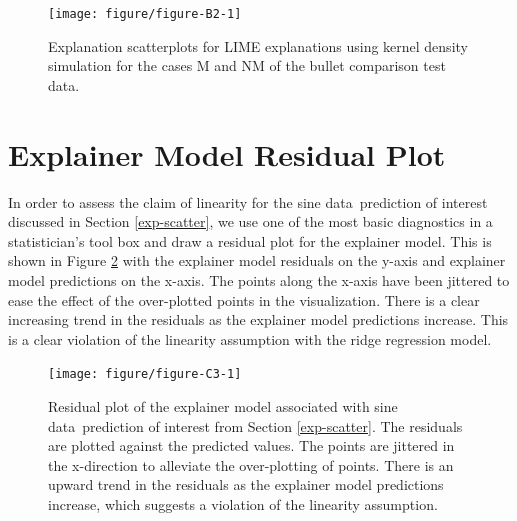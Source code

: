\documentclass[AMS,STIX2COL]{WileyNJD-v2}\usepackage[]{graphicx}\usepackage[]{color}
\newenvironment{knitrout}{}{} %
\newcommand{\data}{sine data}
\begin{document}
\begin{figure}[!thp]
\begin{knitrout}
\color{fgcolor}

{\centering \texttt{[image: figure/figure-B2-1]} 

}



\end{knitrout}
\caption{Explanation scatterplots for LIME explanations using kernel density simulation for the cases M and NM of the bullet comparison test data.}
\label{fig:figure-B2}
\end{figure}

\section{Explainer Model Residual Plot} \label{residual-plot}

In order to assess the claim of linearity for the \data \ prediction of interest discussed in Section \ref{exp-scatter}, we use one of the most basic diagnostics in a statistician's tool box and draw a residual plot for the explainer model. This is shown in Figure \ref{fig:figure-C3} with the explainer model residuals on the y-axis and explainer model predictions on the x-axis. The points along the x-axis have been jittered to ease the effect of the over-plotted points in the visualization. There is a clear increasing trend in the residuals as the explainer model predictions increase. This is a clear violation of the linearity assumption with the ridge regression model.

\begin{figure}[!thp]
\begin{knitrout}
\color{fgcolor}

{\centering \texttt{[image: figure/figure-C3-1]} 

}



\end{knitrout}
\caption{Residual plot of the explainer model associated with \data \ prediction of interest from Section \ref{exp-scatter}. The residuals are plotted against the predicted values. The points are jittered in the x-direction to alleviate the over-plotting of points. There is an upward trend in the residuals as the explainer model predictions increase, which suggests a violation of the linearity assumption.}
\label{fig:figure-C3}
\end{figure}
\end{document}
